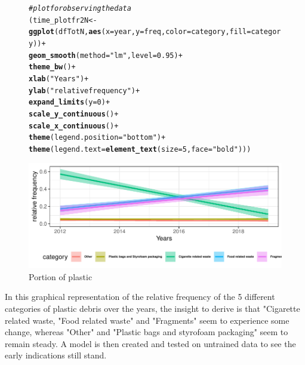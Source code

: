 \documentclass[10pt]{article}\usepackage[]{graphicx}\usepackage[]{color}
\makeatletter
\newcommand{\hlnum}[1]{\textcolor[rgb]{0.686,0.059,0.569}{#1}}%
\newcommand{\hlstr}[1]{\textcolor[rgb]{0.192,0.494,0.8}{#1}}%
\newcommand{\hlcom}[1]{\textcolor[rgb]{0.678,0.584,0.686}{\textit{#1}}}%
\newcommand{\hlopt}[1]{\textcolor[rgb]{0,0,0}{#1}}%
\newcommand{\hlstd}[1]{\textcolor[rgb]{0.345,0.345,0.345}{#1}}%
\newcommand{\hlkwb}[1]{\textcolor[rgb]{0.69,0.353,0.396}{#1}}%
\newcommand{\hlkwc}[1]{\textcolor[rgb]{0.333,0.667,0.333}{#1}}%
\newcommand{\hlkwd}[1]{\textcolor[rgb]{0.737,0.353,0.396}{\textbf{#1}}}%
\newenvironment{kframe}{%
 \def\at@end@of@kframe{}%
 \ifinner\ifhmode%
  \def\at@end@of@kframe{\end{minipage}}%
  \begin{minipage}{\columnwidth}%
 \fi\fi%
 \def\FrameCommand##1{\hskip\@totalleftmargin \hskip-\fboxsep
 \colorbox{shadecolor}{##1}\hskip-\fboxsep
     \hskip-\linewidth \hskip-\@totalleftmargin \hskip\columnwidth}%
 \MakeFramed {\advance\hsize-\width
   \@totalleftmargin\z@ \linewidth\hsize
   \@setminipage}}%
 {\par\unskip\endMakeFramed%
 \at@end@of@kframe}
\newenvironment{knitrout}{}{} %
\makeatother
\begin{document}
\begin{figure}[H] 
\begin{center}
\begin{knitrout}\small
{}\color{fgcolor}\begin{kframe}
\begin{alltt}
\hlcom{# plot for observing the data}
\hlstd{(time_plotfr2N} \hlkwb{<-} \hlkwd{ggplot}\hlstd{(dfTotN,} \hlkwd{aes}\hlstd{(}\hlkwc{x} \hlstd{= year,} \hlkwc{y} \hlstd{= freq,} \hlkwc{color}\hlstd{=category,} \hlkwc{fill} \hlstd{= category))} \hlopt{+}
  \hlkwd{geom_smooth}\hlstd{(}\hlkwc{method}\hlstd{=}\hlstr{"lm"}\hlstd{,} \hlkwc{level}\hlstd{=}\hlnum{0.95}\hlstd{)} \hlopt{+}
  \hlkwd{theme_bw}\hlstd{()} \hlopt{+}
  \hlkwd{xlab}\hlstd{(}\hlstr{"Years"}\hlstd{)} \hlopt{+}
  \hlkwd{ylab}\hlstd{(}\hlstr{"relative frequency"}\hlstd{)} \hlopt{+}
  \hlkwd{expand_limits}\hlstd{(}\hlkwc{y}\hlstd{=}\hlnum{0}\hlstd{)} \hlopt{+}
  \hlkwd{scale_y_continuous}\hlstd{()} \hlopt{+}
  \hlkwd{scale_x_continuous}\hlstd{()}\hlopt{+}
  \hlkwd{theme}\hlstd{(}\hlkwc{legend.position}\hlstd{=}\hlstr{"bottom"}\hlstd{)}\hlopt{+}
  \hlkwd{theme}\hlstd{(}\hlkwc{legend.text} \hlstd{=} \hlkwd{element_text}\hlstd{(}\hlkwc{size}\hlstd{=}\hlnum{5}\hlstd{,} \hlkwc{face}\hlstd{=}\hlstr{"bold"}\hlstd{)))}
\end{alltt}
\end{kframe}
\includegraphics[width=1\linewidth]{figure/unnamed-chunk-34-1} 

\end{knitrout}
\caption {Portion of plastic}
\label{figG1}
\end {center}
\end {figure}


In this graphical representation of the relative frequency of the 5 different categories of plastic debris over the years, the insight to derive is that "Cigarette related waste, "Food related waste" and "Fragments" seem to experience some change, whereas "Other" and "Plastic bags and styrofoam packaging" seem to remain steady. A model is then created and tested on untrained data to see the early indications still stand.
\end{document}
